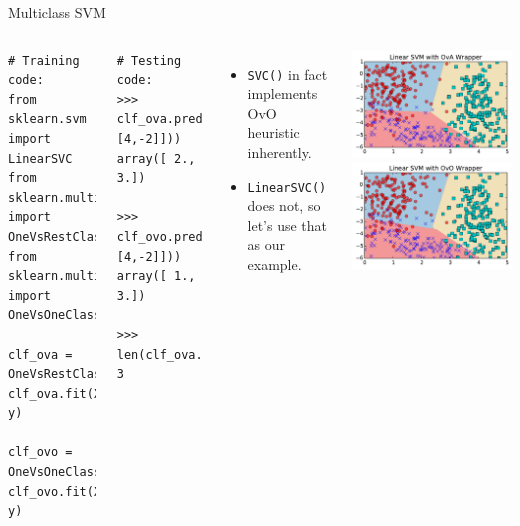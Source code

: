 \documentclass[10pt, aspectratio=169]{beamer} %
\begin{document}
\begin{frame}[fragile,allowframebreaks=0.8]
{Multiclass SVM}
\begin{columns}[onlytextwidth]
\begin{lstlisting}
# Training code:
from sklearn.svm import LinearSVC
from sklearn.multiclass import OneVsRestClassifier
from sklearn.multiclass import OneVsOneClassifier

clf_ova = OneVsRestClassifier(LinearSVC())
clf_ova.fit(X, y)

clf_ovo = OneVsOneClassifier(LinearSVC())
clf_ovo.fit(X, y)
\end{lstlisting}
\begin{lstlisting}
# Testing code:
>>> clf_ova.predict(np.array([[2,-3.2], [4,-2]]))
array([ 2.,  3.])

>>> clf_ovo.predict(np.array([[2,-3.2], [4,-2]]))
array([ 1.,  3.])

>>> len(clf_ova.estimators_)
3
\end{lstlisting}
\begin{itemize}
	\item \verb+SVC()+ in fact implements OvO heuristic inherently.
	\item \verb+LinearSVC()+ does not, so let's use that as our example.
\end{itemize}
\begin{center}
\includegraphics[width=0.6\columnwidth]{3Class_SVM_classes_OvA.pdf}\\
\includegraphics[width=0.6\columnwidth]{3Class_SVM_classes_OvO.pdf}
\end{center}
\end{columns}
\end{frame}
\end{document}
